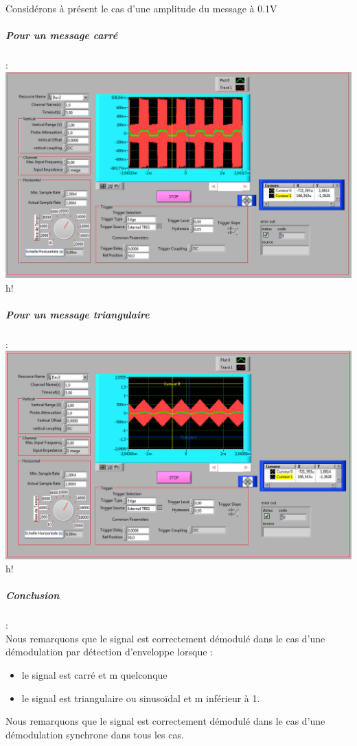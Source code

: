 \documentclass[french]{article}
\begin{document}
Considérons à présent le cas d'une amplitude du message à 0.1V

\subparagraph{Pour un message carré} : \\
\includegraphics[width=\textwidth]{carre_synchrone_01.png}{h!}

\subparagraph{Pour un message triangulaire} : \\
\includegraphics[width=\textwidth]{triangle_synchrone_01.png}{h!}

\subparagraph{Conclusion} : \\
Nous remarquons que le signal est correctement démodulé dans le cas d'une démodulation par détection d'enveloppe lorsque : 
\begin{itemize}
\item le signal est carré et m quelconque
\item le signal est triangulaire ou sinusoïdal et m inférieur à 1.
\end{itemize}
Nous remarquons que le signal est correctement démodulé dans le cas d'une démodulation synchrone dans tous les cas. 
\end{document}
